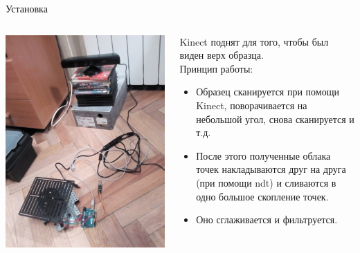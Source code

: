 \documentclass{beamer}
\begin{document}
\begin{frame}{Установка}
    \begin{columns}[T]
        \begin{column}[T]{5cm}
            \includegraphics[scale=0.06]{devices}
        \end{column}
        \begin{column}[T]{5cm}
            \small
            Kinect поднят для того, чтобы  был виден верх образца. \\
            Принцип работы:
            \begin{itemize}
            \item
            Образец сканируется при помощи Kinect, поворачивается на небольшой угол, снова сканируется и т.д.
            \item
            После этого полученные облака точек накладываются друг на друга (при помощи ndt) и сливаются в одно большое скопление точек.
            \item
            Оно сглаживается и фильтруется.
            \end{itemize}

        \end{column}
    \end{columns}
\end{frame}
\end{document}
